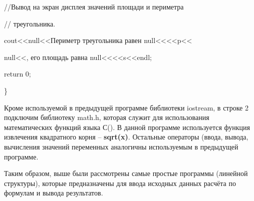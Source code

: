 {\upshape
//Вывод на экран дисплея значений площади и периметра}

{\upshape
// треугольника. }

{\upshape
 cout{\textless}{\textless}null{<<}Периметр треугольника равен null{<<}{\textless}{\textless}p{\textless}{\textless}}

{\upshape
null{<<}, его площадь равна null{<<}{\textless}{\textless}s{\textless}{\textless}endl; }

{\upshape
 return 0; }

{\upshape
\}}

Кроме используемой в предыдущей программе библиотеки iostream, в строке 2 подключим библиотеку
math.h, которая служит для использования математических функций языка С(). В данной
программе используется функция извлечения квадратного корня – \textbf{sqrt(x)}. Остальные
операторы (ввода, вывода, вычисления значений переменных аналогичны используемым в предыдущей программе.

Таким образом, выше были рассмотрены самые простые программы (линейной структуры), которые предназначены для ввода
исходных данных расчёта по формулам и вывода результатов.

%


\printindex
%

\endinput
